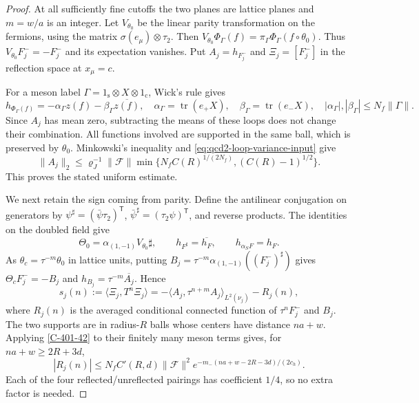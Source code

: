 \documentclass[11pt,letterpaper,reqno]{amsart}
\theoremstyle{definition}
\theoremstyle{remark}
\begin{document}
\begin{proof}
At all sufficiently fine cutoffs the two planes
are lattice planes and $m=w/a$ is an integer.
Let $V_{\theta_0}$ be the linear parity transformation
on the fermions, using the matrix
$\sigma(e_\mu)\otimes\tau_2$. Then
$V_{\theta_0}\Phi_\Gamma(f)
=\pi_\Gamma\Phi_\Gamma(f\circ\theta_0)$.
Thus $V_{\theta_0}F_j^-=-F_j^-$ and its expectation
vanishes. Put $A_j=h_{F_j^-}$ and
$\Xi_j=[F_j^-]$ in the reflection space at $x_\mu=c$.

For a meson label $\Gamma=1_{\mathrm s}\otimes
X\otimes1_{\mathrm c}$, Wick's rule gives
\[
 h_{\Phi_\Gamma(f)}=-\alpha_\Gamma z(f)
                              -\beta_\Gamma\overline{z(f)},
 \quad\alpha_\Gamma=\operatorname{tr}(e_+X),
 \quad\beta_\Gamma=\operatorname{tr}(e_-X),
 \quad |\alpha_\Gamma|,|\beta_\Gamma|\le N_f\|\Gamma\|.
\]
Since $A_j$ has mean zero, subtracting the means
of these loops does not change their combination.
All functions involved are supported in the
same ball, which is preserved by $\theta_0$.
Minkowski's inequality and
\eqref{eq:qcd2-loop-variance-input} give
\[
 \|A_j\|_2\le
  \varrho_J^{-1}\|\mathcal F\|
          \min\{N_fC(R)^{1/(2N_f)},(C(R)-1)^{1/2}\}.
\]
This proves the stated uniform estimate.

We next retain the sign coming from parity.
Define the antilinear conjugation on generators by
$\psi^\sharp=(\bar\psi\tau_2)^{\mathsf T}$,
$\bar\psi^\sharp=(\tau_2\psi)^{\mathsf T}$,
and reverse products. The identities on the doubled
field give
\[
 \Theta_0=\alpha_{(1,-1)}V_{\theta_0}\sharp,
 \qquad h_{F^\sharp}=\overline{h_F},
 \qquad h_{\alpha_SF}=h_F.
\]
As $\theta_c=\tau^{-m}\theta_0$ in lattice units,
putting $B_j=\tau^{-m}\alpha_{(1,-1)}((F_j^-)^\sharp)$
gives $\Theta_cF_j^-=-B_j$ and
$h_{B_j}=\tau^{-m}\overline{A_j}$. Hence
\begin{equation}\label{C-401-32}
 s_j(n):=\langle\Xi_j,T^n\Xi_j\rangle
   =-\langle A_j,\tau^{n+m}A_j\rangle_{L^2(\nu_j)}-R_j(n),
\end{equation}
where $R_j(n)$ is the averaged conditional connected
function of $\tau^nF_j^-$ and $B_j$.
The two supports are in radius-$R$ balls whose
centers have distance $na+w$. Applying
\cref{C-401-42} to their finitely many meson terms
gives, for $na+w\ge2R+3d$,
\[
 |R_j(n)|\le N_fC'(R,d)\|\mathcal F\|^2
                   e^{-m_-(na+w-2R-3d)/(2c_h)}.
\]
Each of the four reflected/unreflected pairings
has coefficient $1/4$, so no extra factor is needed.


\end{proof}
\end{document}
